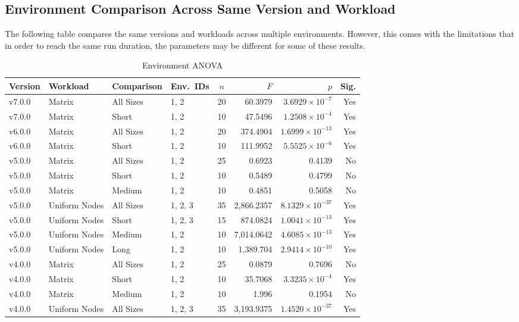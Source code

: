 \subsection{Environment Comparison Across Same Version and Workload}
The following table compares the same versions and workloads across multiple environments. However, this comes with the limitations that in order to reach the same run duration, the parameters may be different for some of these results.

\begin{table}[H]\caption{Environment ANOVA}
\centering\footnotesize\setlength{\tabcolsep}{5pt}\renewcommand{\arraystretch}{1.12}
\begin{tabular}{@{}llllcrrr@{}}
\toprule
Version & Workload & Comparison & Env.\ IDs & $n$ & $F$ & $p$ & Sig. \\ \midrule
v7.0.0 & Matrix & All Sizes & 1, 2 & 20 & 60.3979 & $3.6929\times10^{-7}$ & Yes \\
v7.0.0 & Matrix & Short & 1, 2 & 10 & 47.5496 & $1.2508\times10^{-4}$ & Yes \\
v6.0.0 & Matrix & All Sizes & 1, 2 & 20 & 374.4904 & $1.6999\times10^{-13}$ & Yes \\
v6.0.0 & Matrix & Short & 1, 2 & 10 & 111.9952 & $5.5525\times10^{-6}$ & Yes \\
v5.0.0 & Matrix & All Sizes & 1, 2 & 25 & 0.6923 & 0.4139 & No \\
v5.0.0 & Matrix & Short & 1, 2 & 10 & 0.5489 & 0.4799 & No \\
v5.0.0 & Matrix & Medium & 1, 2 & 10 & 0.4851 & 0.5058 & No \\
v5.0.0 & Uniform Nodes & All Sizes & 1, 2, 3 & 35 & 2,866.2357 & $8.1329\times10^{-37}$ & Yes \\
v5.0.0 & Uniform Nodes & Short & 1, 2, 3 & 15 & 874.0824 & $1.0041\times10^{-13}$ & Yes \\
v5.0.0 & Uniform Nodes & Medium & 1, 2 & 10 & 7,014.0642 & $4.6085\times10^{-13}$ & Yes \\
v5.0.0 & Uniform Nodes & Long & 1, 2 & 10 & 1,389.704 & $2.9414\times10^{-10}$ & Yes \\
v4.0.0 & Matrix & All Sizes & 1, 2 & 25 & 0.0879 & 0.7696 & No \\
v4.0.0 & Matrix & Short & 1, 2 & 10 & 35.7068 & $3.3235\times10^{-4}$ & Yes \\
v4.0.0 & Matrix & Medium & 1, 2 & 10 & 1.996 & 0.1954 & No \\
v4.0.0 & Uniform Nodes & All Sizes & 1, 2, 3 & 35 & 3,193.9375 & $1.4520\times10^{-37}$ & Yes \\

\end{tabular}
\end{table}
